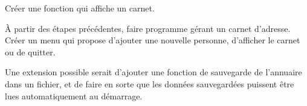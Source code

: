 \documentclass[10pt]{article}\usepackage[enonce]{exemptty}
\begin{document}
\Question Créer une fonction qui affiche un carnet.

\Question À partir des étapes précédentes, faire programme gérant un carnet
d'adresse. Créer un menu qui propose d'ajouter une nouvelle personne,
d'afficher le carnet ou de quitter.

\medskip
Une extension possible serait d'ajouter une fonction de sauvegarde de
l'annuaire dans un fichier, et de faire en sorte que les données sauvegardées
puissent être lues automatiquement au démarrage. 





\end{document}
